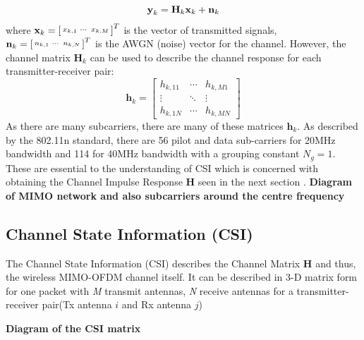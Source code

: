 \vspace{-11pt}
\begin{equation}\label{eqn:2.2}
    \textbf{y}_k = \textbf{H}_k\textbf{x}_k+\textbf{n}_k
    \vspace{-11pt}
\end{equation}
where $\textbf{x}_k = \begin{bsmallmatrix}x_{k,1} & \cdots & x_{k,M}\end{bsmallmatrix}^T$ is the vector of transmitted signals, $\textbf{n}_k = \begin{bsmallmatrix}n_{k,1} & \cdots & n_{k,N}\end{bsmallmatrix}^T$ is the AWGN (noise) vector for the channel. However, the channel matrix $\textbf{H}_{k}$ can be used to describe the channel response for each transmitter-receiver pair: 
\vspace{-11pt}
\begin{equation}\label{eqn:2.3}
\textbf{h}_{k}=\left[
\begin{array}{ccc}
    h_{k,11} & \cdots & h_{k,M1} \\
   \vdots & \ddots & \vdots \\
    h_{k,1N} & \cdots & h_{k,MN}
\end{array}
\right]
\end{equation}
As there are many subcarriers, there are many of these matrices $\textbf{h}_{k}$. As described by the 802.11n standard, there are 56 pilot and data sub-carriers for 20MHz bandwidth and 114 for 40MHz bandwidth with a grouping constant $N_g = 1$. These are essential to the understanding of CSI which is concerned with obtaining the Channel Impulse Response \textbf{H} seen in the next section \citep{full802.11nStandard}.
\textbf{Diagram of MIMO network and also subcarriers around the centre frequency}

\subsection{Channel State Information (CSI)}
The Channel State Information (CSI) describes the Channel Matrix \textbf{H} and thus, the wireless MIMO-OFDM channel itself. It can be described in 3-D matrix form for one packet with \textit{M} transmit antennas, \textit{N} receive antennas for a transmitter-receiver pair(Tx antenna $i$ and Rx antenna $j$)

\textbf{Diagram of the CSI matrix}

